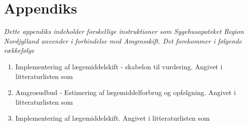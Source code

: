 \chapter{Appendiks} \label{cha:AppD}
\textit{Dette appendiks indeholder forskellige instruktioner som Sygehusapoteket Region Nordjylland anvender i forbindelse med Amgrosskift. Det forekommer i følgende rækkefølge}

\begin{enumerate}
\item Implementering af lægemiddelskift - skabelon til vurdering. Angivet i litteraturlisten som~\citep{Sygehusapoteket2017}
\item Amgrosudbud - Estimering af lægemiddelforbrug og opfølgning. Angivet i litteraturlisten som~\citep{Sygehusapoteket2017a}
\item Implementering af lægemiddelskift. Angivet i litteraturlisten som~\citep{Sygehusapoteket2017b}
\end{enumerate}




